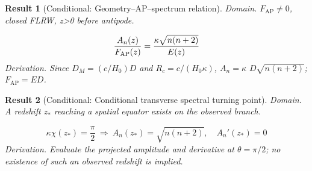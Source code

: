 \documentclass[aps,prd,onecolumn,notitlepage,groupedaddress,11pt]{revtex4-2}
\newtheorem{result}{Result}
\begin{document}
\begin{result}[\textsf{Conditional}: Geometry--AP--spectrum relation]\label{bridge:6}
\textit{Domain.} \(F_{\mathrm{AP}}\ne0\), closed FLRW, z>0 before antipode.\par
\begin{equation}\label{bridgeeq:6}
\frac{A_n(z)}{F_{\rm AP}(z)}=\frac{\kappa\sqrt{n(n+2)}}{E(z)}
\end{equation}
\textit{Derivation.} Since \(D_M=(c/H_0)D\) and \(R_c=c/(H_0\kappa)\), \(A_n=\kappa\) \(D\sqrt{n(n+2)}\); \(F_{\mathrm{AP}}=ED\).
\end{result}
\begin{result}[\textsf{Conditional}: Conditional transverse spectral turning point]\label{bridge:7}
\textit{Domain.} A redshift \(z_*\) reaching a spatial equator exists on the observed branch.\par
\begin{equation}\label{bridgeeq:7}
\kappa\chi(z_*)=\frac\pi2\ \Longrightarrow\ A_n(z_*)=\sqrt{n(n+2)},\quad A_n\prime(z_*)=0
\end{equation}
\textit{Derivation.} Evaluate the projected amplitude and derivative at \(\theta=\pi/2\); no existence of such an observed redshift is implied.
\end{result}
\end{document}

